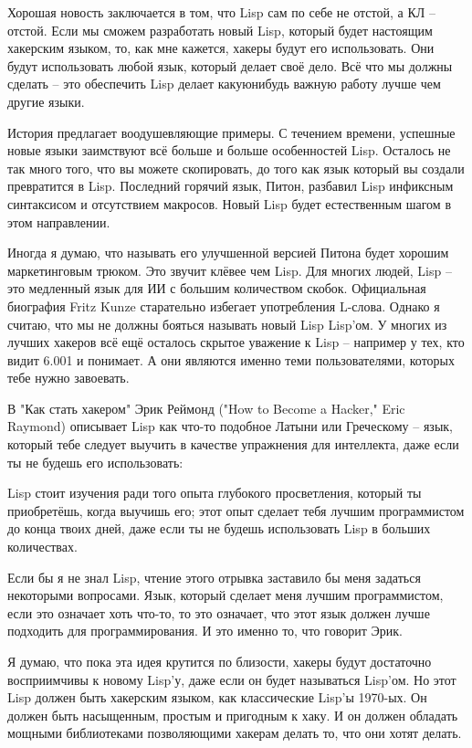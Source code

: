 \documentclass[ebook,12pt,oneside,openany]{memoir}
\begin{document}
Хорошая новость заключается в том, что Lisp сам по себе не отстой, а
КЛ -- отстой. Если мы сможем разработать новый Lisp, который будет
настоящим хакерским языком, то, как мне кажется, хакеры будут его
использовать. Они будут использовать любой язык, который делает своё
дело. Всё что мы должны сделать -- это обеспечить Lisp делает
какуюнибудь важную работу лучше чем другие языки.

История предлагает воодушевляющие примеры. С течением времени,
успешные новые языки заимствуют всё больше и больше особенностей Lisp.
Осталось не так много того, что вы можете скопировать, до того как
язык который вы создали превратится в Lisp. Последний горячий язык,
Питон, разбавил Lisp инфиксным синтаксисом и отсутствием макросов.
Новый Lisp будет естественным шагом в этом направлении.

Иногда я думаю, что называть его улучшенной версией Питона будет
хорошим маркетинговым трюком. Это звучит клёвее чем Lisp. Для многих
людей, Lisp -- это медленный язык для ИИ с большим количеством скобок.
Официальная биография Fritz Kunze старательно избегает употребления
L-слова. Однако я считаю, что мы не должны бояться называть новый Lisp
Lisp'ом. У многих из лучших хакеров всё ещё осталось скрытое уважение
к Lisp -- например у тех, кто видит 6.001 и понимает. А они являются
именно теми пользователями, которых тебе нужно завоевать.

В "Как стать хакером" Эрик Реймонд ("How to Become a Hacker," Eric
Raymond) описывает Lisp как что-то подобное Латыни или Греческому --
язык, который тебе следует выучить в качестве упражнения для
интеллекта, даже если ты не будешь его использовать:

Lisp стоит изучения ради того опыта глубокого просветления, который ты
приобретёшь, когда выучишь его; этот опыт сделает тебя лучшим
программистом до конца твоих дней, даже если ты не будешь использовать
Lisp в больших количествах.

Если бы я не знал Lisp, чтение этого отрывка заставило бы меня
задаться некоторыми вопросами. Язык, который сделает меня лучшим
программистом, если это означает хоть что-то, то это означает, что
этот язык должен лучше подходить для программирования. И это именно
то, что говорит Эрик.

Я думаю, что пока эта идея крутится по близости, хакеры будут
достаточно восприимчивы к новому Lisp'у, даже если он будет называться
Lisp'ом. Но этот Lisp должен быть хакерским языком, как классические
Lisp'ы 1970-ых. Он должен быть насыщенным, простым и пригодным к хаку.
И он должен обладать мощными библиотеками позволяющими хакерам делать
то, что они хотят делать.
\end{document}
